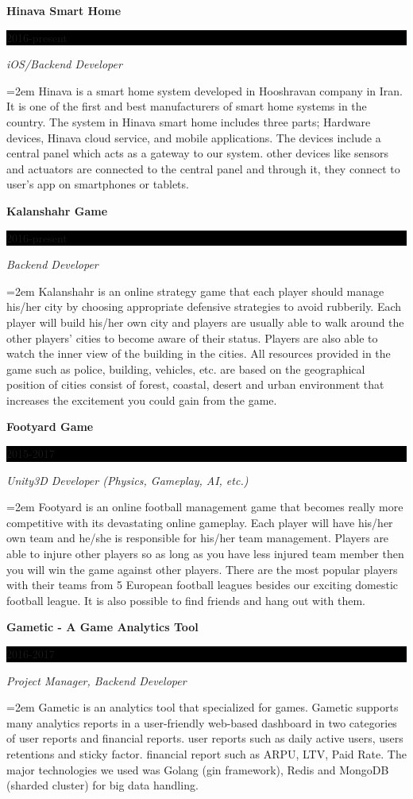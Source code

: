 \documentclass[paper=a4,fontsize=11pt]{scrartcl} %
\newcommand{\sepspace}{\vspace*{1em}}        %
\newcommand{\EducationEntry}[4]{
        \noindent \textbf{#1} \hfill      %
        \colorbox{Black}{%
            \parbox{6em}{%
            \hfill\color{White}#2}} \par  %
        \noindent \textit{#3} \par        %
        \noindent\hangindent=2em\hangafter=0 \small #4 %
        \normalsize \par}
\newcommand{\ExperienceEntry}[4]{         %
        \noindent \textbf{#1} \hfill      %
        \colorbox{Black}{%
            \parbox{6em}{%
            \hfill\color{White}#2}} \par      %
        \noindent \textit{#3} \par        %
        \noindent\hangindent=2em\hangafter=0 \small #4 %
        \normalsize \par}
\begin{document}
\ExperienceEntry{Hinava Smart Home}{2016-present}{iOS/Backend Developer}{Hinava is a smart home system developed in Hooshravan company in Iran. It is one of the first and best manufacturers of smart home systems in the country. The system in Hinava smart home includes three parts; Hardware devices, Hinava cloud service, and mobile applications. The devices include a central panel which acts as a gateway to our system. other devices like sensors and actuators are connected to the central panel and through it, they connect to user's app on smartphones or tablets.}
\sepspace

\ExperienceEntry{Kalanshahr Game}{2016-present}{Backend Developer}{Kalanshahr is an online strategy game that each player should manage his/her city by choosing appropriate defensive strategies to avoid rubberily. Each player will build his/her own city and players are usually able to walk around the other players' cities to become aware of their status. Players are also able to watch the inner view of the building in the cities. All resources provided in the game such as police, building, vehicles, etc. are based on the geographical position of cities consist of forest, coastal, desert and urban environment that increases the excitement you could gain from the game.}
\sepspace


\ExperienceEntry{Footyard Game}{2015-2017}{Unity3D Developer (Physics, Gameplay, AI, etc.)}{Footyard is an online football management game that becomes really more competitive with its devastating online gameplay. Each player will have his/her own team and he/she is responsible for his/her team management. Players are able to injure other players so as long as you have less injured team member then you will win the game against other players. There are the most popular players with their teams from 5 European football leagues besides our exciting domestic football league. It is also possible to find friends and hang out with them.}
\sepspace

\ExperienceEntry{Gametic - A Game Analytics Tool}{2016-2017}{Project Manager, Backend Developer}{Gametic is an analytics tool that specialized for games. Gametic supports many analytics reports in a user-friendly web-based dashboard in two categories of user reports and financial reports. user reports such as daily active users, users retentions and sticky factor. financial report such as ARPU, LTV, Paid Rate.
The major technologies we used was Golang (gin framework), Redis and MongoDB (sharded cluster) for big data handling.}
\sepspace
\end{document}
